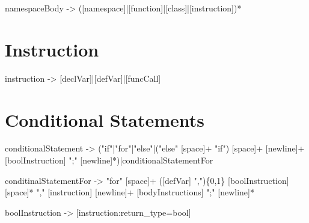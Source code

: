 \noindent namespaceBody -> ([namespace]|[function]|[class]|[instruction])*


\section{Instruction}

\noindent instruction -> [declVar]|[defVar]|[funcCall]


\section{Conditional Statements}

\noindent conditionalStatement -> ("if"|"for"|"else"|("else" [space]+ "if") [space]+ [newline]+ [boolInstruction] ";" [newline]*)|conditionalStatementFor

\noindent conditinalStatementFor ->  "for" [space]+ ([defVar] ",")\{0,1\} [boolInstruction] [space]* "," [instruction] [newline]+ [bodyInstructions] ";" [newline]*

\noindent boolInstruction -> [instruction:return\_type=bool]
